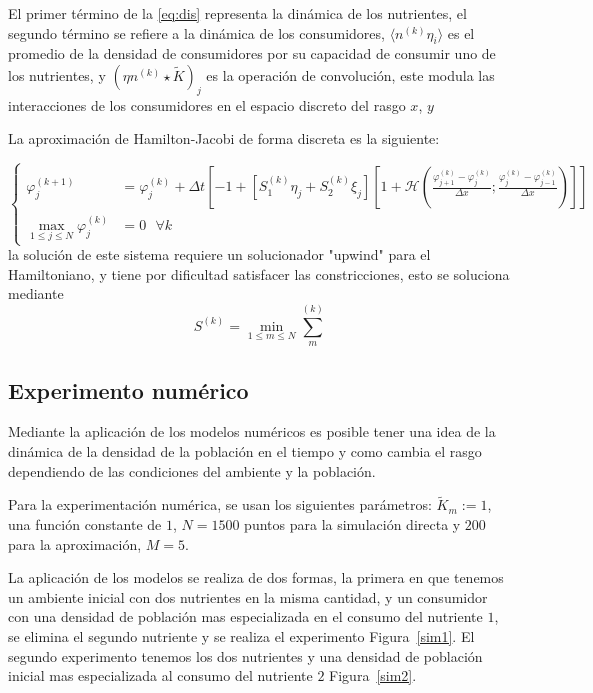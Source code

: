 El primer término de la \eqref{eq:dis} representa la dinámica de los nutrientes, el segundo término se refiere a la dinámica de los consumidores, $\langle{n^{(k)}\eta_{i}}\rangle$ es el promedio de la densidad de consumidores por su capacidad de consumir uno de los nutrientes, y $(\eta n^{(k)}\star \tilde{K})_{j}$ es la operación de convolución, este modula las interacciones de los consumidores en el espacio discreto del rasgo $x$, $y$

La aproximación de Hamilton-Jacobi de forma discreta es la siguiente:

\begin{equation}
	\left\{
	\begin{aligned}
		\label{HJ_dis}
		\varphi_{j}^{(k+1)}                   & =\varphi_{j}^{(k)}+\Delta t\left[ -1+[S_{1}^{(k)}\eta_{j}+S_{2}^{(k)}\xi_{j}]\left[ 1+\mathcal{H}\left( \frac{\varphi_{j+1}^{(k)}-\varphi_{j}^{(k)}}{\Delta x};\frac{\varphi_{j}^{(k)}-\varphi_{j-1}^{(k)}}{\Delta x} \right) \right] \right] \\
		\max_{1\leq j\leq N}\varphi_{j}^{(k)} & =0\:\:\: \forall k
	\end{aligned}
	\right.
\end{equation}
la solución de este sistema requiere un solucionador "upwind" para el Hamiltoniano, y tiene por dificultad satisfacer las constricciones, esto se soluciona mediante
\begin{equation*}
	S^{(k)} = \min_{1\leq m\leq N}\sum_m^{(k)}
\end{equation*}

\subsection{Experimento numérico}
Mediante la aplicación de los modelos numéricos es posible tener una idea de la dinámica de la densidad de la población en el tiempo y como cambia el rasgo dependiendo de las condiciones del ambiente y la población.

Para la experimentación numérica, se usan los siguientes parámetros: $\tilde{K}_m:=1$, una función constante de $1$, $N=1500$ puntos para la simulación directa y $200$ para la aproximación, $M=5$\citep{dieckman2005}.

La aplicación de los modelos se realiza de dos formas, la primera en que tenemos un ambiente inicial con dos nutrientes en la misma cantidad, y un consumidor con una densidad de población mas especializada en el consumo del nutriente $1$, se elimina el segundo nutriente y se realiza el experimento Figura~\ref{sim1}. El segundo experimento tenemos los dos nutrientes y una densidad de población inicial mas especializada al consumo del nutriente $2$ Figura~\ref{sim2}.

